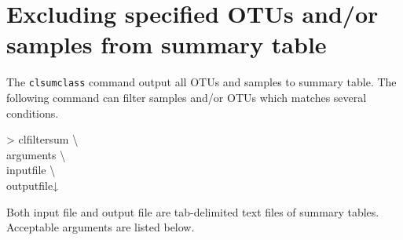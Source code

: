 \documentclass[titlepage,10pt,a4paper,english]{jsbook}
\newenvironment{cmd}{\begin{oframed}\raggedright\ttfamily\footnotesize\setlength{\baselineskip}{1.4em}}{\end{oframed}\vspace{-1em}}
\begin{document}
\section{Excluding specified OTUs and/or samples from summary table}\label{section:clfiltersum}

The \texttt{clsumclass} command output all OTUs and samples to summary table.
The following command can filter samples and/or OTUs which matches several conditions.

\begin{cmd}
{\textgreater} clfiltersum {\textbackslash}\\
arguments {\textbackslash}\\
inputfile {\textbackslash}\\
outputfile↓
\end{cmd}

Both input file and output file are tab-delimited text files of summary tables.
Acceptable arguments are listed below.
\end{document}
